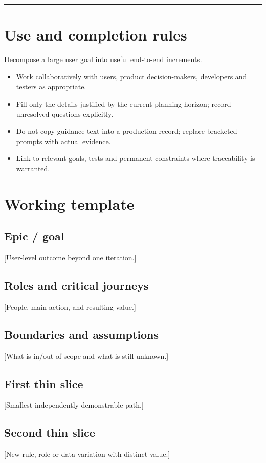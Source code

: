 \documentclass[11pt,letterpaper]{article}
\begin{document}
\tableofcontents\medskip\noindent\rule{\linewidth}{0.4pt}\medskip
\section{Use and completion rules}
Decompose a large user goal into useful end-to-end increments.

\begin{itemize}[leftmargin=*,itemsep=2pt]
\item Work collaboratively with users, product decision-makers, developers and testers as appropriate.
\item Fill only the details justified by the current planning horizon; record unresolved questions explicitly.
\item Do not copy guidance text into a production record; replace bracketed prompts with actual evidence.
\item Link to relevant goals, tests and permanent constraints where traceability is warranted.
\end{itemize}
\section{Working template}
\subsection{Epic / goal}
[User-level outcome beyond one iteration.]

\subsection{Roles and critical journeys}
[People, main action, and resulting value.]

\subsection{Boundaries and assumptions}
[What is in/out of scope and what is still unknown.]

\subsection{First thin slice}
[Smallest independently demonstrable path.]

\subsection{Second thin slice}
[New rule, role or data variation with distinct value.]
\end{document}
